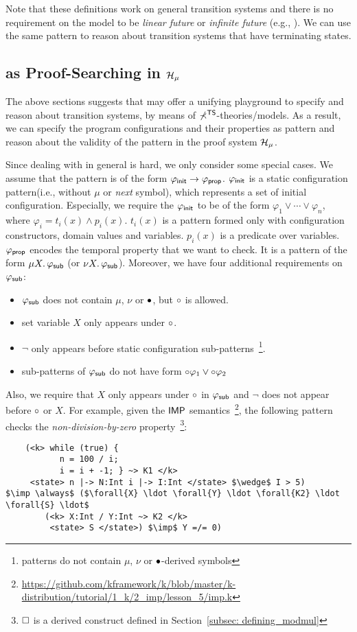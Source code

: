 \documentclass{almostllncs}
\begin{document}
\noindent
Note that these definitions work on general transition systems and there is no requirement on the model to be \emph{linear future} or \emph{infinite future} (e.g., \LTL).
We can use the same pattern to reason about transition systems that have terminating states.

\subsection{\BMC as Proof-Searching in $\mathcal{H}_\mu$}

The above sections suggests that \mmul may offer a unifying playground to
specify and reason about transition systems, by means of $\mathbb{\Sigma}^{\textnormal{\textsf{TS}}}$-theories/models.
As a result, we can specify the program configurations and their properties as \mmul pattern and reason about the validity of the pattern in the proof system $\mathcal{H}_\mu$.

Since dealing with \modmul in general is hard, we only consider some special cases.
We assume that the pattern is of the form $\varphi_{\textnormal{\textsf{init}}} \to \varphi_{\textnormal{\textsf{prop}}}$.
$\varphi_{\textnormal{\textsf{init}}}$ is a static configuration pattern(i.e., without $\mu$ or \emph{next} symbol), which represents a set of initial configuration.
Especially, we require the $\varphi_{\textnormal{\textsf{init}}}$ to be of the form $\varphi_1 \vee \cdots \vee \varphi_n$, where $\varphi_i = t_i(x) \wedge p_i(x)$.
$t_i(x)$ is a pattern formed only with configuration constructors, domain values and variables. 
$p_i(x)$ is a predicate over variables.
$\varphi_{\textnormal{\textsf{prop}}}$ encodes the temporal property that we want to check.
It is a pattern of the form $\mu X \mathord{.} \, \varphi_{\textnormal{\textsf{sub}}}$ (or $\nu X \mathord{.} \, \varphi_{\textnormal{\textsf{sub}}}$). 
Moreover, we have four additional requirements on $\varphi_{\textnormal{\textsf{sub}}}$:
\begin{itemize}
\item $\varphi_{\textnormal{\textsf{sub}}}$ does not contain $\mu$, $\nu$ or ${\bullet}$, but ${\circ}$ is allowed.
\item set variable $X$ only appears under ${\circ}$.
\item $\neg$ only appears before static configuration sub-patterns~\footnote{patterns do not contain $\mu$, $\nu$ or ${\bullet}$-derived symbols}.
\item sub-patterns of $\varphi_{\textnormal{\textsf{sub}}}$ do not have form ${\circ} \varphi_1 \vee {\circ} \varphi_2$
\end{itemize}
Also, we require that $X$ only appears under ${\circ}$ in $\varphi_{\textnormal{\textsf{sub}}}$ and $\neg$ does not appear before ${\circ}$ or $X$.
For example, given the ${\mathsf{IMP}}$ semantics~\footnote{\url{https://github.com/kframework/k/blob/master/k-distribution/tutorial/1_k/2_imp/lesson_5/imp.k}}, the following pattern checks the \emph{non-division-by-zero} property~\footnote{${\square}$ is a derived construct defined in Section~\ref{subsec: defining_modmul}}:
\begin{lstlisting}
    (<k> while (true) { 
           n = 100 / i;
           i = i + -1; } ~> K1 </k>
     <state> n |-> N:Int i |-> I:Int </state> $\wedge$ I > 5)
$\imp \always$ ($\forall{X} \ldot \forall{Y} \ldot \forall{K2} \ldot \forall{S} \ldot$
        (<k> X:Int / Y:Int ~> K2 </k> 
         <state> S </state>) $\imp$ Y =/= 0)
\end{lstlisting}
\end{document}
